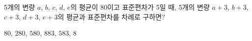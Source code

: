 5개의 변량 $a$, $b$, $c$, $d$, $e$의 평균이 80이고 표준편차가 5일 때, 5개의 변량 $a+3$, $b+3$, $c+3$, $d+3$, $e+3$의 평균과 표준편차를 차례로 구하면?
\begin{choices32}{$80$, $2$}{$80$, $5$}{$80$, $8$}{$83$, $5$}{$83$, $8$}\end{choices32}
